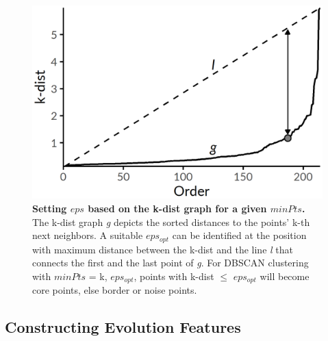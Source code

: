\documentclass[
  oneside]{book}
\begin{document}
\begin{figure}[h]

{\centering \includegraphics[width=0.43\linewidth]{figures/07-k-dist-graph} 

}

\caption{\textbf{Setting \(eps\) based on the k-dist graph for a given \(minPts\).} The k-dist graph \emph{g} depicts the sorted distances to the points' k-th next neighbors. A suitable \(eps_{opt}\) can be identified at the position with maximum distance between the k-dist and the line \emph{l} that connects the first and the last point of \emph{g}. For DBSCAN clustering with \(minPts\) = k, \(eps_{opt}\), points with k-dist \(\leq\) \(eps_{opt}\) will become core points, else border or noise points.}\label{fig:07-k-dist-graph}
\end{figure}

\hypertarget{evo-concept-evo-features}{%
\subsection{Constructing Evolution Features}\label{evo-concept-evo-features}}
\end{document}
